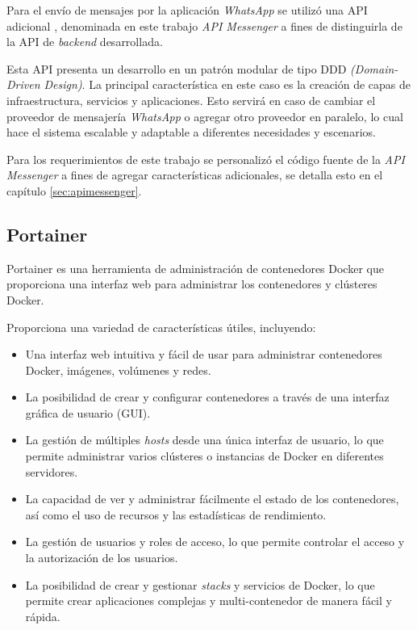 Para el envío de mensajes por la aplicación \textit{WhatsApp} \cite{whatsapp} se utilizó una API adicional \cite{api-whatsapp-ts}, denominada en este trabajo \textit{API Messenger} a fines de distinguirla de la API de \textit{backend} desarrollada.

Esta API presenta un desarrollo en un patrón modular de tipo DDD \textit{(Domain-Driven Design)}. La principal característica en este caso es la creación de capas de infraestructura, servicios y aplicaciones. Esto servirá en caso de cambiar el proveedor de mensajería \textit{WhatsApp} o agregar otro proveedor en paralelo, lo cual hace el sistema escalable y adaptable a diferentes necesidades y escenarios.

Para los requerimientos de este trabajo se personalizó el código fuente de la \textit{API Messenger} a fines de agregar características adicionales, se detalla esto en el capítulo \ref{sec:apimessenger}.

\subsection{Portainer}
\label{subsec:portainer}

Portainer \citep{PortainerDocs} es una herramienta de administración de contenedores Docker \cite{WEBSITE:docker} que proporciona una interfaz web para administrar los contenedores y clústeres Docker. 

Proporciona una variedad de características útiles, incluyendo:

\begin{itemize}
\item Una interfaz web intuitiva y fácil de usar para administrar contenedores Docker, imágenes, volúmenes y redes.
\item La posibilidad de crear y configurar contenedores a través de una interfaz gráfica de usuario (GUI).
\item La gestión de múltiples \textit{hosts} desde una única interfaz de usuario, lo que permite administrar varios clústeres o instancias de Docker en diferentes servidores.
\item La capacidad de ver y administrar fácilmente el estado de los contenedores, así como el uso de recursos y las estadísticas de rendimiento.
\item La gestión de usuarios y roles de acceso, lo que permite controlar el acceso y la autorización de los usuarios.
\item La posibilidad de crear y gestionar \textit{stacks} y servicios de Docker, lo que permite crear aplicaciones complejas y multi-contenedor de manera fácil y rápida.
\end{itemize}

